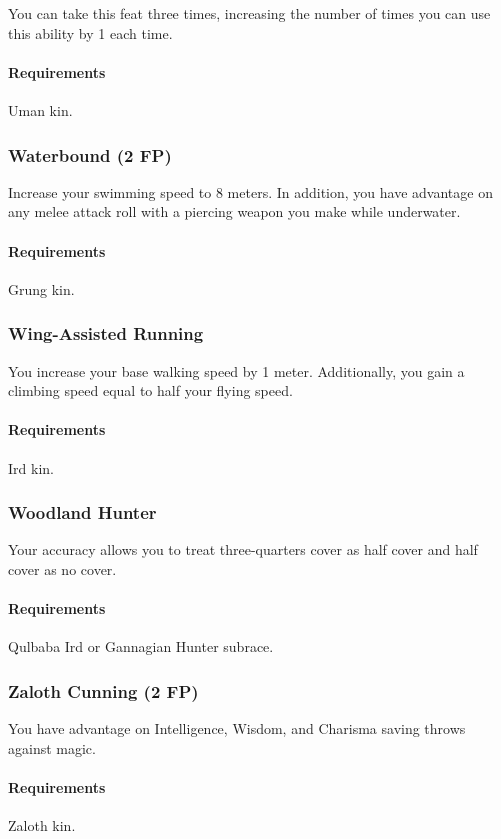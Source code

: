     You can take this feat three times, increasing the number of times you can use this ability by 1 each time.
    \paragraph{Requirements} Uman kin.
\subsubsection{Waterbound (2 FP)} \label{feat::waterbound}
    Increase your swimming speed to 8 meters.
    In addition, you have advantage on any melee attack roll with a piercing weapon you make while underwater.
    \paragraph{Requirements} Grung kin.
\subsubsection{Wing-Assisted Running} \label{feat::wingassistedrunning}
    You increase your base walking speed by 1 meter.
    Additionally, you gain a climbing speed equal to half your flying speed.
    \paragraph{Requirements} Ird kin.
\subsubsection{Woodland Hunter} \label{feat::woodlandhunter}
    Your accuracy allows you to treat three-quarters cover as half cover and half cover as no cover.
    \paragraph{Requirements} Qulbaba Ird or Gannagian Hunter subrace.
\subsubsection{Zaloth Cunning (2 FP)} \label{feat::zalothcunning}
    You have advantage on Intelligence, Wisdom, and Charisma saving throws against magic.
    \paragraph{Requirements} Zaloth kin.
